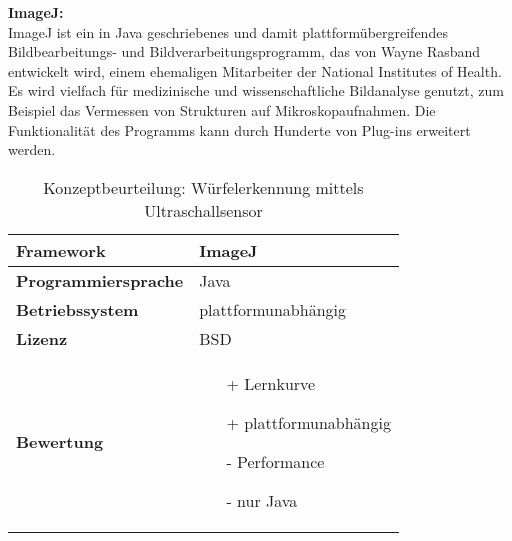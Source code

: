 \documentclass[../../main.tex]{subfiles}
\begin{document}
        \textbf{ImageJ: }\\
        ImageJ ist ein in Java geschriebenes und damit plattformübergreifendes Bildbearbeitungs- und Bildverarbeitungsprogramm, das von Wayne Rasband entwickelt wird, einem ehemaligen Mitarbeiter der National Institutes of Health. Es wird vielfach für medizinische und wissenschaftliche Bildanalyse genutzt, zum Beispiel das Vermessen von Strukturen auf Mikroskopaufnahmen. Die Funktionalität des Programms kann durch Hunderte von Plug-ins erweitert werden.
        \begin{flushleft}
            \begin{table}[h]
            \begin{tabular}{ | l | p{11cm} |}
            \hline
            \textbf{Framework} & ImageJ \\ \hline
            \textbf{Programmiersprache} & Java \\ \hline
            \textbf{Betriebssystem} & plattformunabhängig \\ \hline
            \textbf{Lizenz} & BSD \\ \hline
            \textbf{Bewertung} &  \begin{itemize}
                                    \item[+] Lernkurve
                                    \item[+] plattformunabhängig 
                                    \item[-] Performance
                                    \item[-] nur Java 
                                  \end{itemize} \\ \hline
            \end{tabular}
            \caption{Konzeptbeurteilung: Würfelerkennung mittels Ultraschallsensor}
            \label{tab:konzept_wurfel_ultraschall}
            \end{table}
        \end{flushleft}
        \pagebreak
\end{document}
